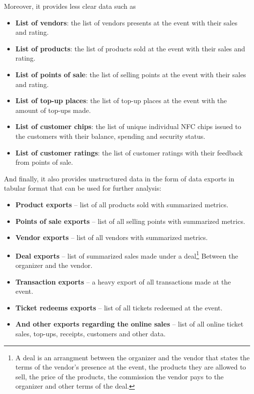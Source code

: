 Moreover, it provides less clear data such as
\begin{itemize}
	\item \textbf{List of vendors}: the list of vendors presents at the event with their sales and rating.
	\item \textbf{List of products}: the list of products sold at the event with their sales and rating.
	\item \textbf{List of points of sale}: the list of selling points at the event with their sales and rating.
	\item \textbf{List of top-up places}: the list of top-up places at the event with the amount of top-ups made.
	\item \textbf{List of customer chips}: the list of unique individual NFC chips issued to the customers with their balance, spending and security status.
	\item \textbf{List of customer ratings}: the list of customer ratings with their feedback from points of sale.
\end{itemize}

And finally, it also provides unstructured data in the form of data exports in tabular format that can be used for further analysis:
\begin{itemize}
	\item \textbf{Product exports} – list of all products sold with summarized metrics.
	\item \textbf{Points of sale exports} – list of all selling points with summarized metrics.
	\item \textbf{Vendor exports} – list of all vendors with summarized metrics.
	\item \textbf{Deal exports} – list of summarized sales made under a deal\footnote{
		A deal is an arrangment between the organizer and the vendor that states the terms of the vendor's presence at the event, the products they are allowed to sell, the price of the products, the commission the vendor pays to the organizer and other terms of the deal.
	} Between the organizer and the vendor.
	\item \textbf{Transaction exports} – a heavy export of all transactions made at the event.
	\item \textbf{Ticket redeems exports} – list of all tickets redeemed at the event.
	\item \textbf{And other exports regarding the online sales} – list of all online ticket sales, top-ups, receipts, customers and other data.
\end{itemize}

